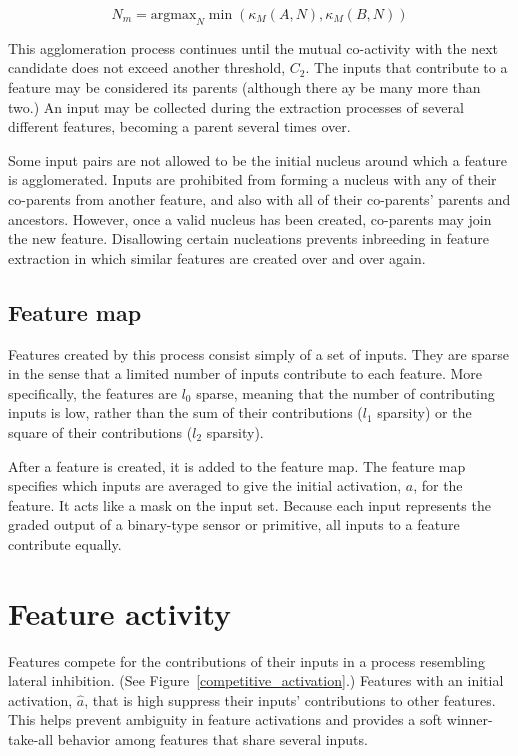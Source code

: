 \begin{equation}
N_m = \mbox{argmax}_{N}  \min(\kappa_M(A,N), \kappa_M(B, N))
\end{equation}

This agglomeration process continues until the mutual co-activity with the next candidate does not exceed another threshold, $C_2$.  The inputs that contribute to a feature may be considered its parents (although there ay be many more than two.) An input may be collected during the extraction processes of several different features, becoming a parent several times over. 

Some input pairs are not allowed to be the initial nucleus around which a feature is agglomerated. Inputs are prohibited from forming a nucleus with any of their co-parents from another feature, and also with all of their co-parents' parents and ancestors. However, once a valid nucleus has been created, co-parents may join the new feature. Disallowing certain nucleations prevents inbreeding in feature extraction in which similar features are created over and over again. 

\subsection{Feature map}

Features created by this process consist simply of a set of inputs. They are sparse in the sense that a limited number of inputs contribute to each feature. More specifically, the features are $l_0$ sparse, meaning that the number of contributing inputs is low, rather than the sum of their contributions ($l_1$ sparsity) or the square of their contributions ($l_2$ sparsity).

After a feature is created, it is added to the feature map. The feature map specifies which inputs are averaged to give the initial activation, $a$, for the feature. It acts like a mask on the input set. Because each input represents the graded output of a binary-type sensor or primitive, all inputs to a feature contribute equally.

\section{Feature activity}

Features compete for the contributions of their inputs in a process resembling lateral inhibition. (See Figure~\ref{competitive_activation}.) Features with an initial activation, $\hat{a}$, that is high suppress their inputs' contributions to other features. This helps prevent ambiguity in feature activations and provides a soft winner-take-all behavior among features that share several inputs.

